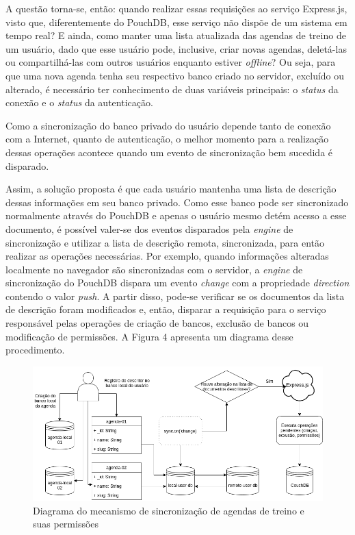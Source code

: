 \documentclass[
	article,			%
	12pt,				%
	oneside,			%
	a4paper,			%
	english,			%
	brazil,				%
	sumario=tradicional
	]{abntex2}
\begin{document}
A questão torna-se, então: quando realizar essas requisições ao serviço Express.js, visto que, diferentemente do PouchDB, esse serviço não dispõe de um sistema em tempo real? E ainda, como manter uma lista atualizada das agendas de treino de um usuário, dado que esse usuário pode, inclusive, criar novas agendas, deletá-las ou compartilhá-las com outros usuários enquanto estiver \textit{offline}? Ou seja, para que uma nova agenda tenha seu respectivo banco criado no servidor, excluído ou alterado, é necessário ter conhecimento de duas variáveis principais: o \textit{status} da conexão e o \textit{status} da autenticação.

Como a sincronização do banco privado do usuário depende tanto de conexão com a Internet, quanto de autenticação, o melhor momento para a realização dessas operações acontece quando um evento de sincronização bem sucedida é disparado.

Assim, a solução proposta é que cada usuário mantenha uma lista de descrição dessas informações em seu banco privado. Como esse banco pode ser sincronizado normalmente através do PouchDB e apenas o usuário mesmo detém acesso a esse documento, é possível valer-se dos eventos disparados pela \textit{engine} de sincronização e utilizar a lista de descrição remota, sincronizada, para então realizar as operações necessárias. Por exemplo, quando informações alteradas localmente no navegador são sincronizadas com o servidor, a \textit{engine} de sincronização do PouchDB dispara um evento \textit{change} com a propriedade \textit{direction }contendo o valor \textit{push}. A partir disso, pode-se verificar se os documentos da lista de descrição foram modificados e, então, disparar a requisição para o serviço responsável pelas operações de criação de bancos, exclusão de bancos ou modificação de permissões. A Figura 4 apresenta um diagrama desse procedimento.

\begin{figure}[H]
	\centering
	\caption{Diagrama do mecanismo de sincronização de agendas de treino e suas permissões}
	\includegraphics[width=1\textwidth]{figures/riffnailer-sync-database-creation}
\end{figure}
\end{document}
